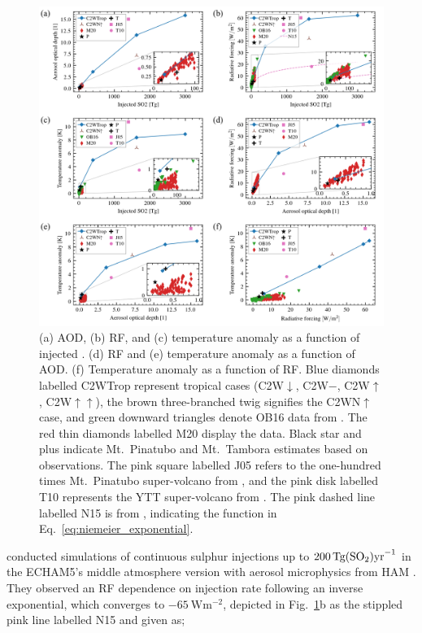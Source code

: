 \documentclass[draft]{agujournal2019}
\begin{document}
\begin{figure}
  \centering
  \includegraphics{figures/figure4.png}

  \caption{(a) AOD, (b) RF, and (c) temperature anomaly as a function of injected
    \@. (d) RF and (e) temperature anomaly as a function of AOD. (f) Temperature
    anomaly as a function of RF. Blue diamonds labelled C2WTrop represent tropical cases
    (C2W\(\downarrow\), C2W\(-\), C2W\(\uparrow\), C2W\(\uparrow\uparrow\)), the brown
    three-branched twig signifies the C2WN\(\uparrow\) case, and green downward triangles
    denote OB16 data from . The red thin diamonds labelled M20
    display the  data. Black star and plus indicate Mt.\ Pinatubo
    and Mt.\ Tambora estimates based on observations. The pink square labelled J05 refers to
    the one-hundred times Mt.\ Pinatubo super-volcano from , and the pink
    disk labelled T10 represents the YTT super-volcano from . The pink
    dashed line labelled N15 is from , indicating the function in
    Eq.~\ref{eq:niemeier_exponential}.}\label{fig:4_parameter_scan}%
\end{figure}

 conducted simulations of continuous sulphur injections up to
\(\SI{200}{\tera\gram(\ce{SO2})\mathrm{yr}^{-1}}\) in the ECHAM5's middle atmosphere
version \cite{giorgetta2006} with aerosol microphysics from HAM \cite{stier2005}. They
observed an RF dependence on  injection rate following an inverse exponential,
which converges to \(\SI{-65}{\watt\meter^{-2}}\), depicted in
Fig.~\ref{fig:4_parameter_scan}b as the stippled pink line labelled N15 and given as;
\end{document}
